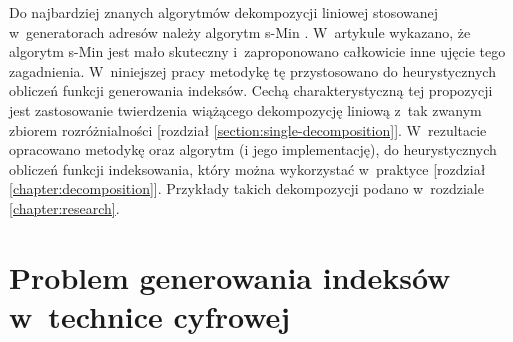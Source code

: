 Do najbardziej znanych algorytmów dekompozycji liniowej stosowanej w~generatorach adresów należy algorytm s-Min \cite{sasao-recent, sasao-s-min}.
W~artykule \cite{redukcja-kompresja} wykazano, że algorytm s-Min jest mało skuteczny i~zaproponowano całkowicie inne ujęcie tego zagadnienia.
W~niniejszej pracy metodykę tę przystosowano do heurystycznych obliczeń funkcji generowania indeksów.
Cechą charakterystyczną tej propozycji jest zastosowanie twierdzenia wiążącego dekompozycję liniową
z~tak zwanym zbiorem rozróżnialności [rozdział \ref{section:single-decomposition}].
W~rezultacie opracowano metodykę oraz algorytm (i jego implementację),
do heurystycznych obliczeń funkcji indeksowania, który można wykorzystać w~praktyce [rozdział \ref{chapter:decomposition}].
Przykłady takich dekompozycji podano w~rozdziale \ref{chapter:research}.

\section{Problem generowania indeksów w~technice cyfrowej}


